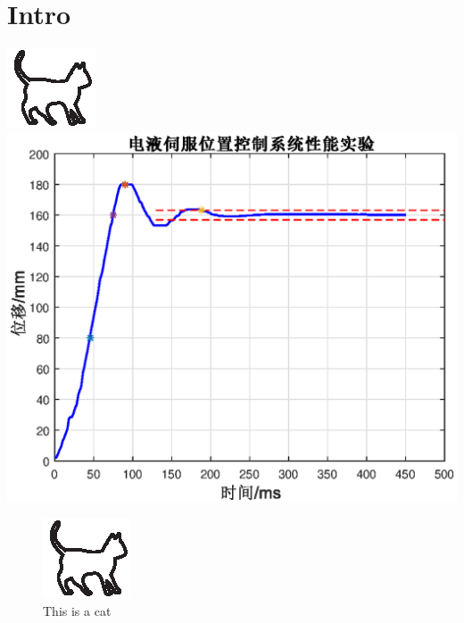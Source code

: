 \documentclass{book}
\numberwithin{equation}{section}  %
\begin{document}
\chapter{Intro}

\includegraphics{cat.eps}
\includegraphics{valve.eps}

\begin{figure}
	\centering %
	\includegraphics[scale=6,angle=30]{cat.eps} 
	\caption{This is a cat}
\end{figure}
\end{document}
